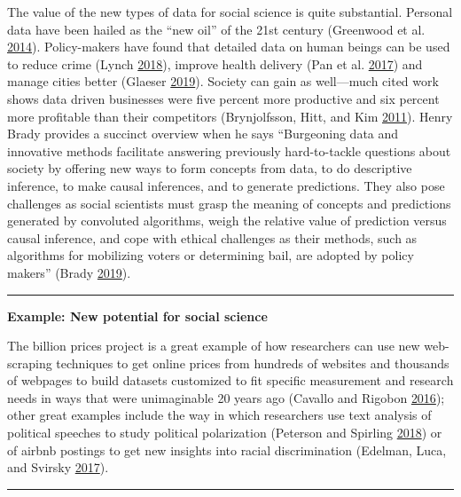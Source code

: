 \documentclass[]{krantz}
\begin{document}
The value of the new types of data for social science is quite
substantial. Personal data have been hailed as the ``new oil'' of the
21st century (Greenwood et al.
\protect\hyperlink{ref-greenwood2014}{2014}). Policy-makers have found
that detailed data on human beings can be used to reduce crime (Lynch
\protect\hyperlink{ref-lynch2018}{2018}), improve health delivery (Pan
et al. \protect\hyperlink{ref-pan2017}{2017}) and manage cities better
(Glaeser \protect\hyperlink{ref-glaeser2019urban}{2019}). Society can
gain as well---much cited work shows data driven businesses were five
percent more productive and six percent more profitable than their
competitors (Brynjolfsson, Hitt, and Kim
\protect\hyperlink{ref-brynjolfsson2011strength}{2011}). Henry Brady
provides a succinct overview when he says ``Burgeoning data and
innovative methods facilitate answering previously hard-to-tackle
questions about society by offering new ways to form concepts from data,
to do descriptive inference, to make causal inferences, and to generate
predictions. They also pose challenges as social scientists must grasp
the meaning of concepts and predictions generated by convoluted
algorithms, weigh the relative value of prediction versus causal
inference, and cope with ethical challenges as their methods, such as
algorithms for mobilizing voters or determining bail, are adopted by
policy makers'' (Brady
\protect\hyperlink{ref-brady2019challenge}{2019}).

\begin{center}\rule{0.5\linewidth}{\linethickness}\end{center}

\textbf{Example: New potential for social science}

The billion prices project is a great example of how researchers can use
new web-scraping techniques to get online prices from hundreds of
websites and thousands of webpages to build datasets customized to fit
specific measurement and research needs in ways that were unimaginable
20 years ago (Cavallo and Rigobon
\protect\hyperlink{ref-cavallo2016billion}{2016}); other great examples
include the way in which researchers use text analysis of political
speeches to study political polarization (Peterson and Spirling
\protect\hyperlink{ref-peterson2018classification}{2018}) or of airbnb
postings to get new insights into racial discrimination (Edelman, Luca,
and Svirsky \protect\hyperlink{ref-edelman2017racial}{2017}).

\begin{center}\rule{0.5\linewidth}{\linethickness}\end{center}
\end{document}
